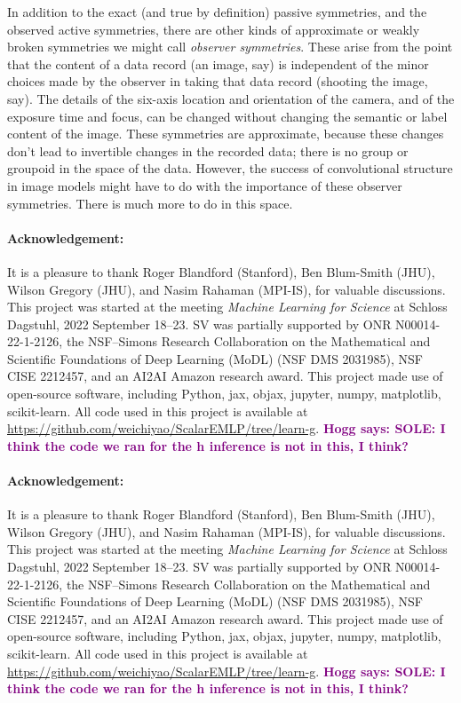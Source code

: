 \documentclass{article} %
\newcommand{\hogg}[1]{\textcolor{purple}{\textbf{Hogg says: #1}}}
\begin{document}
In addition to the exact (and true by definition) passive symmetries, and the observed active symmetries, there are other kinds of approximate or weakly broken symmetries we might call \emph{observer symmetries}.
These arise from the point that the content of a data record (an image, say) is independent of the minor choices made by the observer in taking that data record (shooting the image, say).
The details of the six-axis location and orientation of the camera, and of the exposure time and focus, can be changed without changing the semantic or label content of the image.
These symmetries are approximate, because these changes don't lead to invertible changes in the recorded data; there is no group or groupoid in the space of the data.
However, the success of convolutional structure in image models might have to do with the importance of these observer symmetries.
There is much more to do in this space.

\newcommand{\ack}{\paragraph{Acknowledgement:}
It is a pleasure to thank
   Roger Blandford (Stanford),
   Ben Blum-Smith (JHU),
   Wilson Gregory (JHU),
   and
   Nasim Rahaman (MPI-IS),
for valuable discussions.
This project was started at the meeting \textit{Machine Learning for Science} at Schloss Dagstuhl, 2022 September 18--23.
SV was partially supported by
   ONR N00014-22-1-2126, 
   the NSF–Simons Research Collaboration on the Mathematical and Scientific Foundations of Deep Learning (MoDL) (NSF DMS 2031985),
   NSF CISE 2212457,
   and
   an AI2AI Amazon research award.
This project made use of open-source software, including Python, jax, objax, jupyter, numpy, matplotlib, scikit-learn.
All code used in this project is available at \url{https://github.com/weichiyao/ScalarEMLP/tree/learn-g}. \hogg{SOLE: I think the code we ran for the h inference is not in this, I think?}
}

\makeatletter
\if@preprint
  \ack
\else
  \if@accepted
    \ack
  \fi
\fi
\makeatother

{\raggedright


}

\appendix
\end{document}
